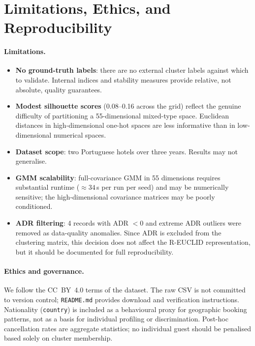 \documentclass[12pt,a4paper]{article}
\begin{document}
\section{Limitations, Ethics, and Reproducibility}
\label{sec:limits}

\paragraph{Limitations.}
\begin{itemize}[noitemsep]
  \item \textbf{No ground-truth labels}: there are no external cluster labels
        against which to validate. Internal indices and stability measures
        provide relative, not absolute, quality guarantees.
  \item \textbf{Modest silhouette scores} (0.08--0.16 across the grid)
        reflect the genuine difficulty of partitioning a 55-dimensional
        mixed-type space. Euclidean distances in high-dimensional one-hot
        spaces are less informative than in low-dimensional numerical spaces.
  \item \textbf{Dataset scope}: two Portuguese hotels over three years.
        Results may not generalise.
  \item \textbf{GMM scalability}: full-covariance GMM in 55 dimensions
        requires substantial runtime ($\approx 34$\,s per run per seed)
        and may be numerically sensitive; the high-dimensional covariance
        matrices may be poorly conditioned.
  \item \textbf{ADR filtering}: 4 records with ADR $< 0$ and extreme ADR
        outliers were removed as data-quality anomalies. Since ADR is
        excluded from the clustering matrix, this decision does not affect
        the R-EUCLID representation, but it should be documented for
        full reproducibility.
\end{itemize}

\paragraph{Ethics and governance.}
We follow the CC~BY~4.0 terms of the dataset.
The raw CSV is not committed to version control; \texttt{README.md}
provides download and verification instructions.
Nationality (\texttt{country}) is included as a behavioural proxy for
geographic booking patterns, not as a basis for individual profiling or
discrimination.
Post-hoc cancellation rates are aggregate statistics; no individual guest
should be penalised based solely on cluster membership.
\end{document}
